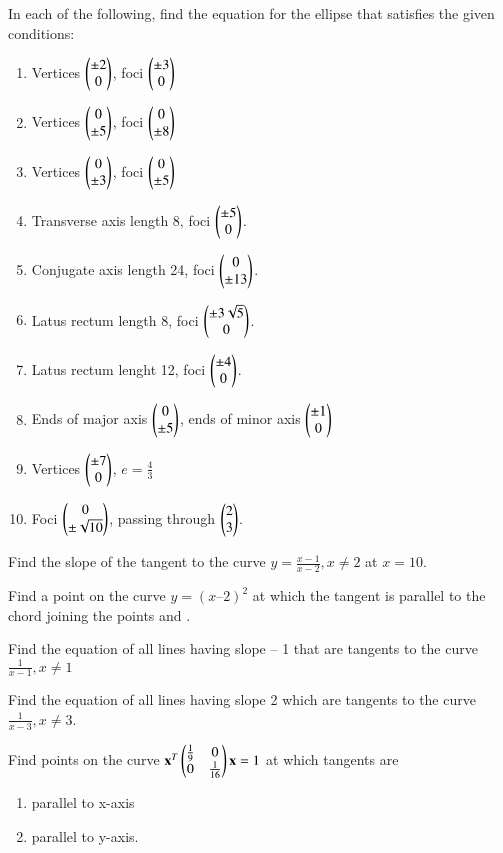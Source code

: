 \item In each of the following, find the equation for the ellipse that satisfies the given conditions:
%
\begin{enumerate}
\item Vertices $\begin{pmatrix}\pm 2\\ 0\end{pmatrix}$, foci $\begin{pmatrix}\pm 3\\ 0\end{pmatrix}$ 
\item  Vertices $\begin{pmatrix}0\\ \pm 5\end{pmatrix}$, foci $\begin{pmatrix}0\\ \pm 8\end{pmatrix}$ 
\item  Vertices $\begin{pmatrix} 0\\ \pm 3\end{pmatrix}$, foci $\begin{pmatrix}0 \\\pm 5\end{pmatrix}$ 
\item  Transverse axis length 8, foci $\begin{pmatrix}\pm 5\\ 0\end{pmatrix}$.
\item  Conjugate axis length 24, foci $\begin{pmatrix}0 \\ \pm 13\end{pmatrix}$.
\item  Latus rectum  length 8, foci $\begin{pmatrix} \pm 3\sqrt{5} \\ 0\end{pmatrix}$.
\item  Latus rectum  lenght 12, foci $\begin{pmatrix} \pm 4 \\ 0\end{pmatrix}$.
\item  Ends of major axis $\begin{pmatrix}0\\ \pm 5 \end{pmatrix}$, ends of minor axis $\begin{pmatrix}\pm 1\\ 0\end{pmatrix}$ 
\item  Vertices $\begin{pmatrix}  \pm 7 \\ 0\end{pmatrix}$, $e = \frac{4}{3}$
\item  Foci $\begin{pmatrix} 0\\  \pm \sqrt{10}\end{pmatrix}$, passing through $\begin{pmatrix}2\\3\end{pmatrix}$.

\end{enumerate}
%
\item Find the slope of the tangent to the curve $y = \frac{x-1}{x-2}, x\ne 2$ at $x = 10$.
\item Find a point on the curve $y = (x – 2)^2$ at which the tangent is parallel to the chord joining the points  and .
\item Find the equation of all lines having slope – 1 that are tangents to the curve $\frac{1}
{x -1}, x \ne 1$
\item Find the equation of all lines having slope 2 which are tangents to the curve $\frac{1}
{x - 3} , x \ne 3$.
%
\\
\solution

\item Find points on the curve 
$
\mathbf{x}^T\begin{pmatrix}\frac{1}{9} & 0 \\ 0 & \frac{1}{16}\end{pmatrix}\mathbf{x} = 1
$
%
at which tangents are
\begin{enumerate}
\item  parallel to x-axis
\item  parallel to y-axis.
\end{enumerate}
%
\solution


